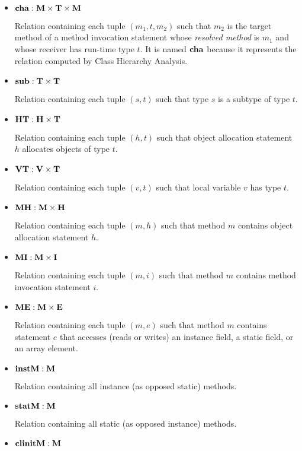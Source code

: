 \documentclass{article}
\providecommand\Mdom{{\bf M}}
\providecommand\Idom{{\bf I}}
\providecommand\Vdom{{\bf V}}
\providecommand\Hdom{{\bf H}}
\providecommand\Edom{{\bf E}}
\providecommand\Tdom{{\bf T}}
\providecommand\instM{{\bf instM}}
\providecommand\statM{{\bf statM}}
\providecommand\MH{{\bf MH}}
\providecommand\MI{{\bf MI}}
\providecommand\ME{{\bf ME}}
\providecommand\cha{{\bf cha}}
\providecommand\sub{{\bf sub}}
\providecommand\HT{{\bf HT}}
\providecommand\VT{{\bf VT}}
\providecommand\clinitM{{\bf clinitM}}
\begin{document}
\begin{itemize}

\item
$\cha : \Mdom \times \Tdom \times \Mdom$

Relation containing each tuple $(m_1,t,m_2)$ such that $m_2$ is
the target method of a method invocation statement whose {\it resolved method}
is $m_1$ and whose receiver has run-time type $t$.
It is named $\cha$ because it represents the relation
computed by Class Hierarchy Analysis.

\item
$\sub : \Tdom \times \Tdom$

Relation containing each tuple $(s,t)$ such that type $s$ is a
subtype of type $t$.

\item
$\HT : \Hdom \times \Tdom$

Relation containing each tuple $(h,t)$ such that object allocation
statement $h$ allocates objects of type $t$.

\item
$\VT : \Vdom \times \Tdom$

Relation containing each tuple $(v,t)$ such that local variable $v$
has type $t$.

\item
$\MH : \Mdom \times \Hdom$

Relation containing each tuple $(m,h)$ such that method $m$ contains
object allocation statement $h$.

\item
$\MI : \Mdom \times \Idom$

Relation containing each tuple $(m,i)$ such that method $m$ contains
method invocation statement $i$.

\item
$\ME : \Mdom \times \Edom$

Relation containing each tuple $(m,e)$ such that method $m$ contains
statement $e$ that accesses (reads or writes) an instance field, a
static field, or an array element.

\item
$\instM : \Mdom$

Relation containing all instance (as opposed static) methods.

\item
$\statM : \Mdom$

Relation containing all static (as opposed instance) methods.

\item
$\clinitM : \Mdom$


\end{itemize}
\end{document}
